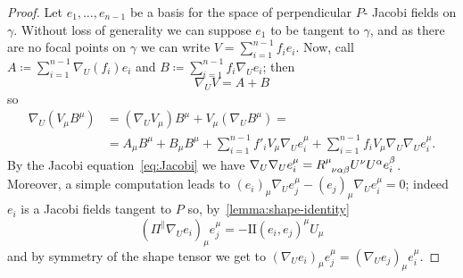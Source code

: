 \begin{proof}
	Let \(e_1, \ldots, e_{n - 1}\) be a basis for the space of perpendicular \(P\)- Jacobi fields on \(\gamma\). Without loss of generality we can suppose \(e_1\) to be tangent to \(\gamma\), and as there are no focal points on \(\gamma\) we can write \(V = \sum_{i = 1}^{n - 1} f_ie_i\).
	Now, call \(A \coloneqq \sum_{i = 1}^{n - 1} \nabla_U(f_i)e_i\) and \(B \coloneqq \sum_{i = 1}^{n - 1} f_i\nabla_Ue_i\); then
	\[
	\nabla_UV = A + B
	\]
	so
	\begin{align*}
		\nabla_U(V_{\mu}B^{\mu}) &= (\nabla_UV_{\mu})B^{\mu} + V_{\mu}(\nabla_UB^{\mu}) = \\
		 &= A_{\mu}B^{\mu} + B_{\mu}B^{\mu} + \sum_{i = 1}^{n - 1}f'_iV_{\mu}\nabla_Ue_i^{\mu} + \sum_{i = 1}^{n - 1}f_iV_{\mu}\nabla_U\nabla_Ue_i^{\mu}.
	\end{align*}
	By the Jacobi equation~\eqref{eq:Jacobi} we have \(\nabla_U\nabla_Ue_i^{\mu} = R\indices{^{\mu}_{\nu\alpha\beta}}U^{\nu}U^{\alpha}e_i^{\beta}\). Moreover, a simple computation leads to \((e_i)_{\mu}\nabla_Ue_j^{\mu} - (e_j)_{\mu}\nabla_Ue_i^{\mu} = 0\); indeed \(e_i\) is  a Jacobi fields tangent to \(P\) so, by~\ref{lemma:shape-identity}
	\[
	(\Pi^{\parallel}\nabla_Ue_i)_{\mu}e_j^{\mu} = - \mathrm{I\!I}(e_i, e_j)^{\mu}U_{\mu}
	\]
	and by symmetry of the shape tensor we get to \((\nabla_Ue_i)_{\mu}e_j^{\mu} = (\nabla_Ue_j)_{\mu}e_i^{\mu}\). 
	

\end{proof}

